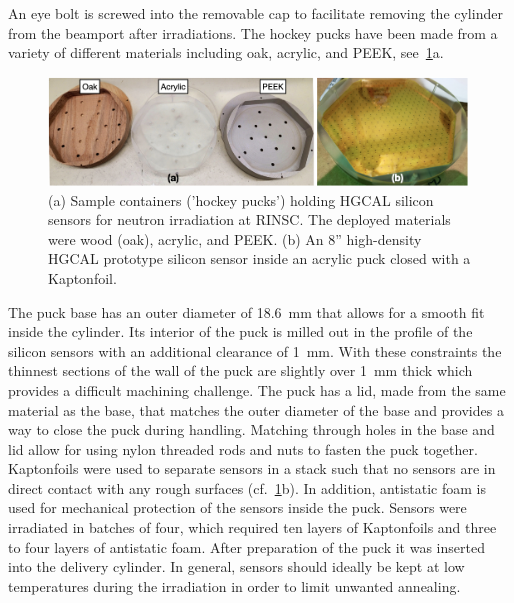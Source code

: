 An eye bolt is screwed into the removable cap to facilitate removing the cylinder from the beamport after irradiations.\newline
The hockey pucks have been made from a variety of different materials including oak, acrylic, and PEEK, see~\ref{fig:Pucks_Arrayed}a. 
\begin{figure}[!hbt]
  \begin{center}
    \includegraphics[width=0.99\textwidth]{figures/figures_edited_002.jpeg}
    \caption{(a) Sample containers ('hockey pucks') holding HGCAL silicon sensors for neutron irradiation at RINSC. 
    The deployed materials were wood (oak), acrylic, and PEEK.
    (b) An 8'' high-density HGCAL prototype silicon sensor inside an acrylic puck closed with a Kapton\texttrademark foil.}
    \label{fig:Pucks_Arrayed}
  \end{center}
\end{figure}
The puck base has an outer diameter of \SI{18.6}{\milli\metre} that allows for a smooth fit inside the cylinder. 
Its interior of the puck is milled out in the profile of the silicon sensors with an additional clearance of \SI{1}{\milli\metre}. 
With these constraints the thinnest sections of the wall of the puck are slightly over \SI{1}{\milli\metre} thick which provides a difficult machining challenge.
The puck has a lid, made from the same material as the base, that matches the outer diameter of the base and provides a way to close the puck during handling.
Matching through holes in the base and lid allow for using nylon threaded rods and nuts to fasten the puck together. \newline
Kapton\texttrademark foils were used to separate sensors in a stack such that no sensors are in direct contact with any rough surfaces (cf.~\ref{fig:Pucks_Arrayed}b).
In addition, antistatic foam is used for mechanical protection of the sensors inside the puck.
Sensors were irradiated in batches of four, which required ten layers of Kapton\texttrademark foils and three to four layers of antistatic foam. 
After preparation of the puck it was inserted into the delivery cylinder.
In general, sensors should ideally be kept at low temperatures during the irradiation in order to limit unwanted annealing.
